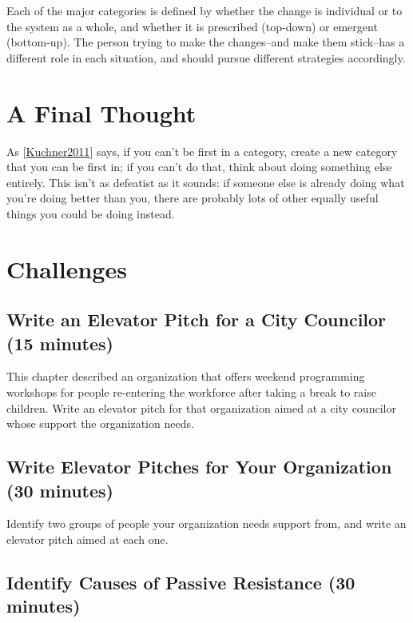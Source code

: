 \documentclass[10pt,statementpaper]{memoir}
\begin{document}
Each of the major categories is defined by whether the change is
individual or to the system as a whole, and whether it is prescribed
(top-down) or emergent (bottom-up). The person trying to make the
changes--and make them stick--has a different role in each situation,
and should pursue different strategies accordingly.

\section{A Final Thought}\label{a-final-thought}

As {[}\href{biblio.html\#kuchner-marketing}{Kuchner2011}{]} says, if you
can't be first in a category, create a new category that you can be
first in; if you can't do that, think about doing something else
entirely. This isn't as defeatist as it sounds: if someone else is
already doing what you're doing better than you, there are probably lots
of other equally useful things you could be doing instead.

\section{Challenges}\label{challenges-11}

\subsection*{Write an Elevator Pitch for a City Councilor (15
minutes)}\label{write-an-elevator-pitch-for-a-city-councilor-15-minutes}

This chapter described an organization that offers weekend programming
workshops for people re-entering the workforce after taking a break to
raise children. Write an elevator pitch for that organization aimed at a
city councilor whose support the organization needs.

\subsection*{Write Elevator Pitches for Your Organization (30
minutes)}\label{write-elevator-pitches-for-your-organization-30-minutes}

Identify two groups of people your organization needs support from, and
write an elevator pitch aimed at each one.

\subsection*{Identify Causes of Passive Resistance (30
minutes)}\label{identify-causes-of-passive-resistance-30-minutes}
\end{document}

